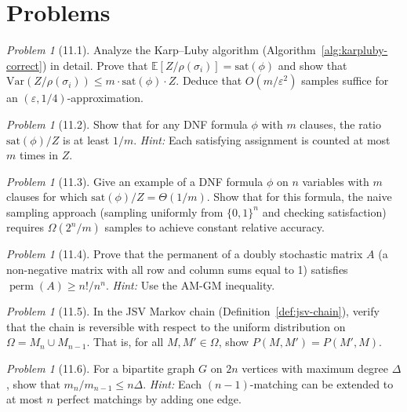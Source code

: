 \documentclass[twoside,12pt]{book}
\theoremstyle{plain}
\theoremstyle{definition}
\theoremstyle{remark}
\newtheorem{problem}[theorem]{Problem}
\begin{document}
\section*{Problems}
\label{sec:problems-11}

\begin{problem}[11.1]
Analyze the Karp--Luby algorithm (Algorithm~\ref{alg:karpluby-correct}) in detail. Prove that $\mathbb{E}[Z / \rho(\sigma_i)] = \text{sat}(\phi)$ and show that $\mathrm{Var}(Z/\rho(\sigma_i)) \leq m \cdot \text{sat}(\phi) \cdot Z$. Deduce that $O(m/\varepsilon^2)$ samples suffice for an $(\varepsilon, 1/4)$-approximation.
\end{problem}

\begin{problem}[11.2]
Show that for any DNF formula $\phi$ with $m$ clauses, the ratio $\text{sat}(\phi)/Z$ is at least $1/m$. \textit{Hint:} Each satisfying assignment is counted at most $m$ times in $Z$.
\end{problem}

\begin{problem}[11.3]
Give an example of a DNF formula $\phi$ on $n$ variables with $m$ clauses for which $\text{sat}(\phi)/Z = \Theta(1/m)$. Show that for this formula, the naive sampling approach (sampling uniformly from $\{0,1\}^n$ and checking satisfaction) requires $\Omega(2^n / m)$ samples to achieve constant relative accuracy.
\end{problem}

\begin{problem}[11.4]
Prove that the permanent of a doubly stochastic matrix $A$ (a non-negative matrix with all row and column sums equal to 1) satisfies $\operatorname{perm}(A) \geq n!/n^n$. \textit{Hint:} Use the AM-GM inequality.
\end{problem}

\begin{problem}[11.5]
In the JSV Markov chain (Definition~\ref{def:jsv-chain}), verify that the chain is reversible with respect to the uniform distribution on $\Omega = M_n \cup M_{n-1}$. That is, for all $M, M' \in \Omega$, show $P(M, M') = P(M', M)$.
\end{problem}

\begin{problem}[11.6]
For a bipartite graph $G$ on $2n$ vertices with maximum degree $\Delta$, show that $m_n / m_{n-1} \leq n \Delta$. \textit{Hint:} Each $(n-1)$-matching can be extended to at most $n$ perfect matchings by adding one edge.
\end{problem}
\end{document}
